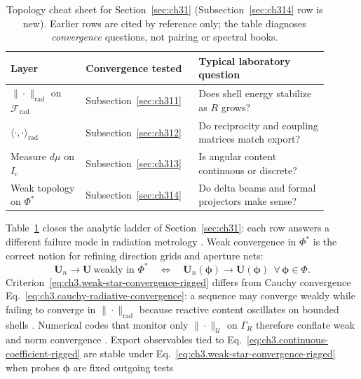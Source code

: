 \begin{table}[t]
\centering
\caption{Topology cheat sheet for Section~\ref{sec:ch31} (Subsection~\ref{sec:ch314} row is new). Earlier
rows are cited by reference only; the table diagnoses \emph{convergence} questions, not pairing or spectral
books.}
\label{tab:ch3.topology-convergence}
\small
\begin{tabular}{@{}p{0.22\linewidth}p{0.30\linewidth}p{0.38\linewidth}@{}}
\toprule
Layer & Convergence tested & Typical laboratory question \\
\midrule
\(\|\cdot\|_{\mathrm{rad}}\) on \(\mathcal{F}_{\mathrm{rad}}\) &
Subsection~\ref{sec:ch311} &
Does shell energy stabilize as \(R\) grows? \\
\addlinespace
\(\langle\cdot,\cdot\rangle_{\mathrm{rad}}\) &
Subsection~\ref{sec:ch312} &
Do reciprocity and coupling matrices match export? \\
\addlinespace
Measure \(d\mu\) on \(I_{\mathrm{c}}\) &
Subsection~\ref{sec:ch313} &
Is angular content continuous or discrete? \\
\addlinespace
Weak topology on \(\Phi^{*}\) &
Subsection~\ref{sec:ch314} &
Do delta beams and formal projectors make sense? \\
\bottomrule
\end{tabular}
\end{table}
Table~\ref{tab:ch3.topology-convergence} closes the analytic ladder of Section~\ref{sec:ch31}: each row answers
a different failure mode in radiation metrology \cite{stratton1941}.
Weak convergence in \(\Phi^{*}\) is the correct notion for refining direction grids and aperture nets:
\begin{equation}
\label{eq:ch3.weak-star-convergence-rigged}
\mathbf{U}_n\to \mathbf{U}\ \text{weakly in }\Phi^{*}
\quad\Longleftrightarrow\quad
\mathbf{U}_n(\boldsymbol{\phi})\to \mathbf{U}(\boldsymbol{\phi})
\ \ \forall\,\boldsymbol{\phi}\in\Phi.
\end{equation}
Criterion~\eqref{eq:ch3.weak-star-convergence-rigged} differs from Cauchy convergence
Eq.~\eqref{eq:ch3.cauchy-radiative-convergence}: a sequence may converge weakly while failing to converge
in \(\|\cdot\|_{\mathrm{rad}}\) because reactive content oscillates on bounded shells
\cite{kato1995}. Numerical codes that monitor only \(\|\cdot\|_{\mathcal{U}}\) on
\(\Gamma_R\) therefore conflate weak and norm convergence \cite{harrington2001}. Export observables tied to
Eq.~\eqref{eq:ch3.continuous-coefficient-rigged} are stable under
Eq.~\eqref{eq:ch3.weak-star-convergence-rigged} when probes \(\boldsymbol{\phi}\) are fixed outgoing tests
